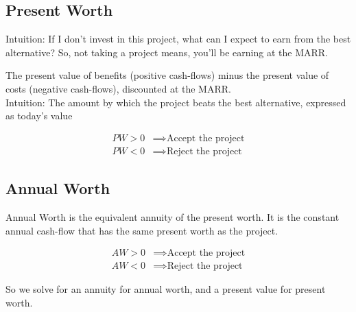 \subsection{Present Worth}

\begin{definition}
    Intuition: If I don't invest in this project, what can I expect to earn from the best alternative? So, not taking a project means, you'll be earning at the MARR.
\end{definition}

\begin{definition}
    The present value of benefits (positive cash-flows) minus the present value of costs (negative cash-flows), discounted at the MARR.\\
    Intuition: The amount by which the project beats the best alternative, expressed as today's value
\end{definition}

\begin{proposition}
    \begin{align}
        PW > 0 & \implies \text{Accept the project} \\
        PW < 0 & \implies \text{Reject the project}
    \end{align}
\end{proposition}

\subsection{Annual Worth}

\begin{definition}
    Annual Worth is the equivalent annuity of the present worth. It is the constant annual cash-flow that has the same present worth as the project.
\end{definition}

\begin{proposition}
    \begin{align}
        AW > 0 & \implies \text{Accept the project} \\
        AW < 0 & \implies \text{Reject the project}
    \end{align}
\end{proposition}

\begin{remark}
    So we solve for an annuity for annual worth, and a present value for present worth.
\end{remark}

